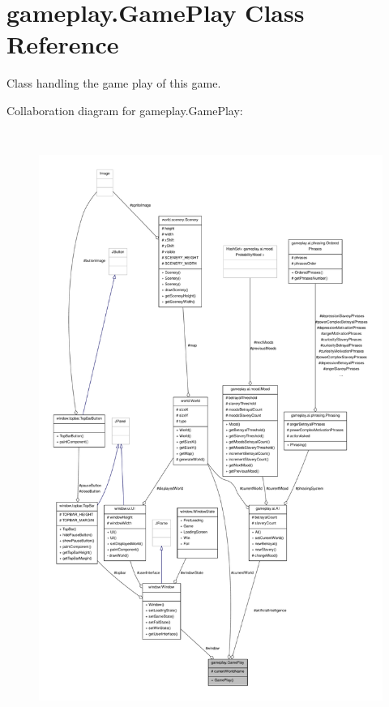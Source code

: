 \hypertarget{classgameplay_1_1_game_play}{\section{gameplay.\-Game\-Play Class Reference}
\label{classgameplay_1_1_game_play}
}


Class handling the game play of this game.  




Collaboration diagram for gameplay.\-Game\-Play\-:
\nopagebreak
\begin{figure}[H]
\begin{center}
\leavevmode
\includegraphics[height=550pt]{classgameplay_1_1_game_play__coll__graph}
\end{center}
\end{figure}
